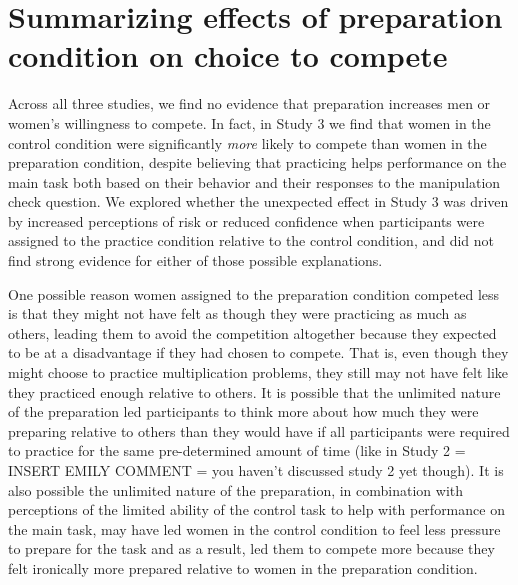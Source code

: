 \documentclass[a4paper,nobind]{templates/ociamthesis}
\begin{document}
\hypertarget{summarizing-effects-of-preparation-condition-on-choice-to-compete}{%
\section{Summarizing effects of preparation condition on choice to compete}\label{summarizing-effects-of-preparation-condition-on-choice-to-compete}}

Across all three studies, we find no evidence that preparation increases men or women's willingness to compete. In fact, in Study 3 we find that women in the control condition were significantly \emph{more} likely to compete than women in the preparation condition, despite believing that practicing helps performance on the main task both based on their behavior and their responses to the manipulation check question. We explored whether the unexpected effect in Study 3 was driven by increased perceptions of risk or reduced confidence when participants were assigned to the practice condition relative to the control condition, and did not find strong evidence for either of those possible explanations.

One possible reason women assigned to the preparation condition competed less is that they might not have felt as though they were practicing as much as others, leading them to avoid the competition altogether because they expected to be at a disadvantage if they had chosen to compete. That is, even though they might choose to practice multiplication problems, they still may not have felt like they practiced enough relative to others. It is possible that the unlimited nature of the preparation led participants to think more about how much they were preparing relative to others than they would have if all participants were required to practice for the same pre-determined amount of time (like in Study 2 = INSERT EMILY COMMENT = you haven't discussed study 2 yet though). It is also possible the unlimited nature of the preparation, in combination with perceptions of the limited ability of the control task to help with performance on the main task, may have led women in the control condition to feel less pressure to prepare for the task and as a result, led them to compete more because they felt ironically more prepared relative to women in the preparation condition.
\end{document}
